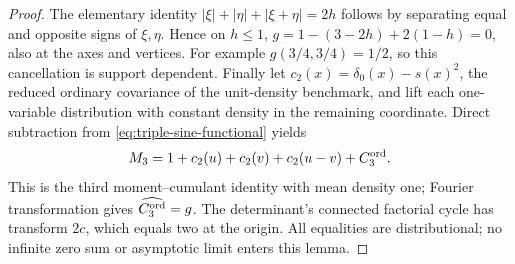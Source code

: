 \documentclass[11pt]{article}
\begin{document}
\begin{proof}
The elementary identity
\(|\xi|+|\eta|+|\xi+\eta|=2h\) follows by separating equal and opposite
signs of \(\xi,\eta\). Hence on \(h\leq1\),
\(g=1-(3-2h)+2(1-h)=0\), also at the axes and vertices.
For example \(g(3/4,3/4)=1/2\), so this cancellation is support dependent.
Finally let \(c_2(x)=\delta_0(x)-s(x)^2\), the reduced ordinary covariance
of the unit-density benchmark, and lift each one-variable distribution
with constant density in the remaining coordinate. Direct subtraction
from \eqref{eq:triple-sine-functional} yields
\[
 M_3=1+c_2(u)+c_2(v)+c_2(u-v)+C_3^{\rm ord}.
\]
This is the third moment--cumulant identity with mean density one;
Fourier transformation gives \(\widehat{C_3^{\rm ord}}=g\).
The determinant's connected factorial cycle has transform \(2c\),
which equals two at the origin. All equalities are distributional;
no infinite zero sum or asymptotic limit enters this lemma.
\end{proof}
\end{document}
